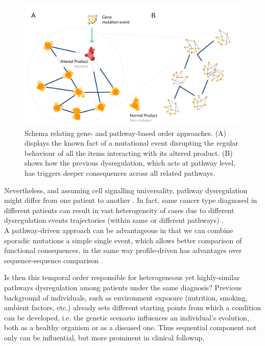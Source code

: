 \begin{figure}
    \centering
    \includegraphics[width=\linewidth]{images/GP.png}
    \caption{Schema relating gene- and pathway-based order approaches. (A) displays the known fact of a mutational event disrupting the regular behaviour of all the items interacting with its altered product. (B) shows how the previous dysregulation, which acts at pathway level, has triggers deeper consequences across all related pathways.}
    \label{fig:gp}
\end{figure}

Nevertheless, and assuming cell signalling universality, pathway dysregulation might differ from one patient to another \cite{Ulitsky2010DEGAS:Diseases}. In fact, same cancer type diagnosed in different patients can result in vast heterogeneity of cases due to different dysregulation events trajectories (within same or different pathways) \cite{Khakabimamaghani2019UncoveringDysregulation}.
\\

A pathway-driven approach can be advantageous in that we can combine sporadic mutations a simple single event, which allows better comparison of functional consequences, in the same way profile-driven has advantages over sequence-sequence comparison \cite{Cheng2012AGliomagenesis}.

Is then this temporal order responsible for heterogeneous yet highly-similar pathways dysregulation among patients under the same diagnosis?
Previous background of individuals, such as environment exposure (nutrition, smoking, ambient factors, etc.) \cite{Jung2007EnvironmentalGenome} already sets different starting points from which a condition can be developed, i.e. the genetic scenario influences an individual’s evolution, both as a healthy organism or as a diseased one. Thus sequential component not only can be influential, but more prominent in clinical followup.


